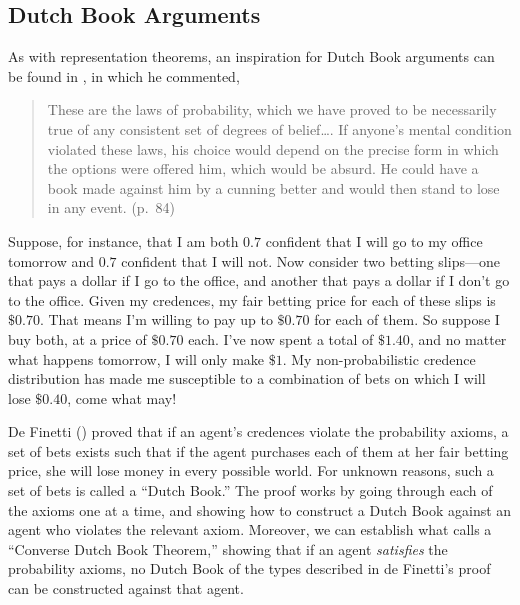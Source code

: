 \subsection{Dutch Book Arguments}
As with representation theorems, an inspiration for Dutch Book arguments can be found in , in which he commented,
\begin{quote}
These are the laws of probability, which we have proved to be necessarily true of any consistent set of degrees of belief\ldots. If anyone's mental condition violated these laws, his choice would depend on the precise form in which the options were offered him, which would be absurd. He could have a book made against him by a cunning better and would then stand to lose in any event. (p.\ 84)
\end{quote}

Suppose, for instance, that I am both $0.7$ confident that I will go to my office tomorrow and $0.7$ confident that I will not. Now consider two betting slips---one that pays a dollar if I go to the office, and another that pays a dollar if I don't go to the office. Given my credences, my fair betting price for each of these slips is $\$0.70$. That means I'm willing to pay up to $\$0.70$ for each of them. So suppose I buy both, at a price of $\$0.70$ each. I've now spent a total of $\$1.40$, and no matter what happens tomorrow, I will only make $\$1$. My non-probabilistic credence distribution has made me susceptible to a combination of bets on which I will lose $\$0.40$, come what may!

De Finetti (\citeyear{deFinettiForesight}) proved that if an agent's credences violate the probability axioms, a set of bets exists such that if the agent purchases each of them at her fair betting price, she will lose money in every possible world. For unknown reasons, such a set of bets is called a ``Dutch Book.'' The proof works by going through each of the axioms one at a time, and showing how to construct a Dutch Book against an agent who violates the relevant axiom. Moreover, we can establish what \citet{HajekArguments} calls a ``Converse Dutch Book Theorem,'' showing that if an agent \emph{satisfies} the probability axioms, no Dutch Book of the types described in de Finetti's proof can be constructed against that agent.


